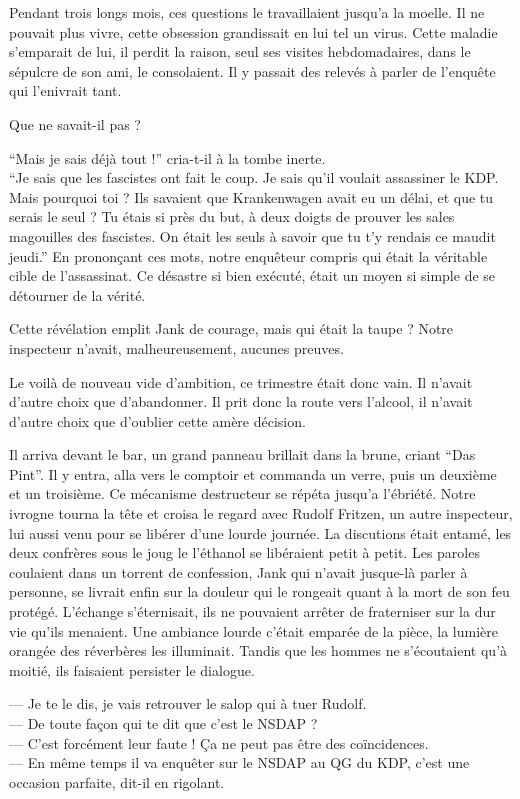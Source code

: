 Pendant trois longs mois, ces questions le travaillaient jusqu'a la moelle.
Il ne pouvait plus vivre, cette obsession grandissait en lui tel un virus.
Cette maladie s'emparait de lui, il perdit la raison, seul ses visites hebdomadaires, dans le sépulcre de son ami, le consolaient.
Il y passait des relevés à parler de l'enquête qui l'enivrait tant.

Que ne savait-il pas ?

\enquote{Mais je sais déjà tout !} cria-t-il à la tombe inerte.\\
\enquote{Je sais que les fascistes ont fait le coup. Je sais qu'il voulait assassiner le KDP.
Mais pourquoi toi ? 
Ils savaient que Krankenwagen avait eu un délai, et que tu serais le seul ?
Tu étais si près du but, à deux doigts de prouver les sales magouilles des fascistes.
On était les seuls à savoir que tu t'y rendais ce maudit jeudi.} 
En prononçant ces mots, notre enquêteur compris qui était la véritable cible de l'assassinat.
Ce désastre si bien exécuté, était un moyen si simple de se détourner de la vérité.

Cette révélation emplit Jank de courage, mais qui était la taupe ? 
Notre inspecteur n'avait, malheureusement, aucunes preuves. 

Le voilà de nouveau vide d'ambition, ce trimestre était donc vain. 
Il n'avait d'autre choix que d'abandonner.
Il prit donc la route vers l'alcool, il n'avait d'autre choix que d'oublier cette amère décision.

Il arriva devant le bar, un grand panneau brillait dans la brune, criant \enquote{{\tgothfamily Das Pint}}.
Il y entra, alla vers le comptoir et commanda un verre, puis un deuxième et un troisième.
Ce mécanisme destructeur se répéta jusqu'a l'ébriété. 
Notre ivrogne tourna la tête et croisa le regard avec Rudolf Fritzen, un autre inspecteur, lui aussi venu pour se libérer d'une lourde journée.
La discutions était entamé, les deux confrères sous le joug le l'éthanol se libéraient petit à petit. 
Les paroles coulaient dans un torrent de confession, Jank qui n'avait jusque-là parler à personne, se livrait enfin 
sur la douleur qui le rongeait quant à la mort de son feu protégé.
L'échange s'éternisait, ils ne pouvaient arrêter de fraterniser sur la dur vie qu'ils menaient.
Une ambiance lourde c'était emparée de la pièce, la lumière orangée des réverbères les illuminait. 
Tandis que les hommes ne s'écoutaient qu'à moitié, ils faisaient persister le dialogue.

--- Je te le dis, je vais retrouver le salop qui à tuer Rudolf.\\
--- De toute façon qui te dit que c'est le NSDAP ?\\
--- C'est forcément leur faute ! Ça ne peut pas être des coïncidences.\\
--- En même temps il va enquêter sur le NSDAP au QG du KDP, c'est une occasion parfaite, dit-il en rigolant.

